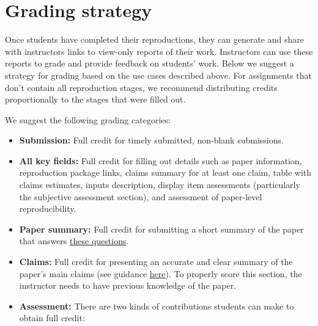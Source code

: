 \documentclass[
  openany]{book}
\providecommand{\tightlist}{%
  \setlength{\itemsep}{0pt}\setlength{\parskip}{0pt}}
\begin{document}
\hypertarget{grading-strategy}{%
\section{Grading strategy}\label{grading-strategy}}

Once students have completed their reproductions, they can generate and share with instructors links to view-only reports of their work. Instructors can use these reports to grade and provide feedback on students' work. Below we suggest a strategy for grading based on the use cases described above. For assignments that don't contain all reproduction stages, we recommend distributing credits proportionally to the stages that were filled out.

We suggest the following grading categories:

\begin{itemize}
\tightlist
\item
  \textbf{Submission:} Full credit for timely submitted, non-blank submissions.\\
\item
  \textbf{All key fields:} Full credit for filling out details such as paper information, reproduction package links, claims summary for at least one claim, table with claims estimates, inputs description, display item assessments (particularly the subjective assessment section), and assessment of paper-level reproducibility.\\
\item
  \textbf{Paper summary:} Full credit for submitting a short summary of the paper that answers \href{https://bitss.github.io/ACRE/scoping.html\#read-sum}{these questions}.\\
\item
  \textbf{Claims:} Full credit for presenting an accurate and clear summary of the paper's main claims (see guidance \href{https://bitss.github.io/ACRE/scoping.html\#scoping}{here}). To properly score this section, the instructor needs to have previous knowledge of the paper.\\
\item
  \textbf{Assessment:} There are two kinds of contributions students can make to obtain full credit:


\end{itemize}
\end{document}
